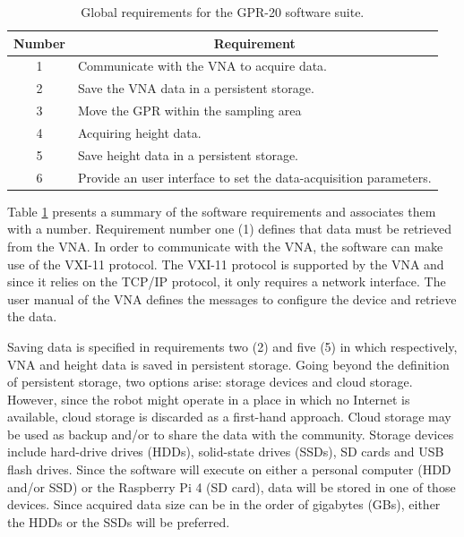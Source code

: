 \documentclass{article}
\begin{document}
\begin{table}[h]
    \centering
    \begin{tabular}{|c|p{10cm}|}
         \hline \multicolumn{1}{|c|}{\textbf{Number}} & \multicolumn{1}{c|}{\textbf{Requirement}} \\ \hline
         1 & Communicate with the VNA to acquire data. \\ \hline
         2 & Save the VNA data in a persistent storage. \\ \hline
         3 & Move the GPR within the sampling area \\ \hline
         4 & Acquiring height data. \\ \hline
         5 & Save height data in a persistent storage. \\ \hline
         6 & Provide an user interface to set the data-acquisition parameters. \\ \hline
    \end{tabular}
    \caption{Global requirements for the GPR-20 software suite.}
    \label{tab:software_requirements}
\end{table}

Table \ref{tab:software_requirements} presents a summary of the software requirements and associates them with a number. Requirement number one (1) defines that data must be retrieved from the VNA. In order to communicate with the VNA, the software can make use of the VXI-11 protocol. The VXI-11 protocol is supported by the VNA and since it relies on the TCP/IP protocol, it only requires a network interface. The user manual of the VNA defines the messages to configure the device and retrieve the data. 

Saving data is specified in requirements two (2) and five (5) in which respectively, VNA and height data is saved in persistent storage. Going beyond the definition of persistent storage, two options arise: storage devices and cloud storage. However, since the robot might operate in a place in which no Internet is available, cloud storage is discarded as a first-hand approach. Cloud storage may be used as backup and/or to share the data with the community. Storage devices include hard-drive drives (HDDs), solid-state drives (SSDs), SD cards and USB flash drives. Since the software will execute on either a personal computer (HDD and/or SSD) or the Raspberry Pi 4 (SD card), data will be stored in one of those devices. Since acquired data size can be in the order of gigabytes (GBs), either the HDDs or the SSDs will be preferred.
\end{document}

